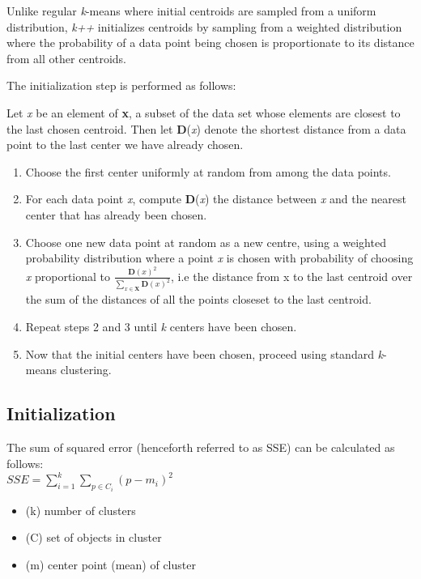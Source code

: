 \documentclass[12pt]{article}
\begin{document}
  \par Unlike regular \textit{k}-means where initial centroids are sampled from a uniform distribution, \textit{k++} initializes centroids by sampling from a weighted distribution where the probability of a data point being chosen is proportionate to its distance from all other centroids.

  \par The initialization step is performed as follows:
  \begin{center}
    Let \textit{x} be an element of \textbf{x}, a subset of the data set whose elements are closest to the last chosen centroid. Then let \textbf{D}(\textit{x}) denote the shortest distance from a data point to the last center we have already chosen.
  \end{center}
  \begin{enumerate}
  \item Choose the first center uniformly at random from among the data points.
  \item For each data point \textit{x}, compute \textbf{D}(\textit{x}) the distance between \textit{x} and the nearest center that has already been chosen.
  \item Choose one new data point at random as a new centre, using a weighted probability distribution where a point \textit{x} is chosen with probability of choosing \textit{x} proportional to $\frac{\mathbf{D}(\mathit{x})^2}{\sum \limits_{\mathit{x} \in \mathbf{X}} \mathbf{D}(\mathit{x})^2}$, i.e the distance from x to the last centroid over the sum of the distances of all the points closeset to the last centroid.
  \item Repeat steps 2 and 3 until \textit{k} centers have been chosen.
  \item Now that the initial centers have been chosen, proceed using standard \textit{k}-means clustering.
  \end{enumerate}

\subsection {Initialization}
  The sum of squared error (henceforth referred to as SSE) can be calculated as follows:\\
  $SSE=\sum \limits_{i=1}^k \sum \limits_{p \in C_i} (p-m_i)^2$
  \begin{itemize}
    \item (k) number of clusters
    \item (C) set of objects in cluster
    \item (m) center point (mean) of cluster
  \end{itemize}
\end{document}
